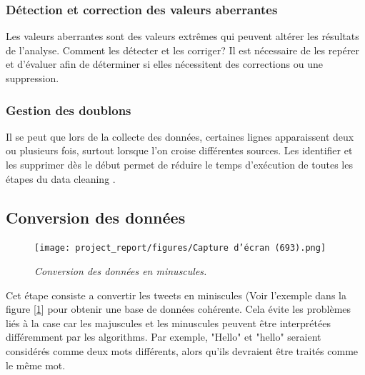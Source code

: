 \subsubsection{Détection et correction des valeurs aberrantes}
Les valeurs aberrantes sont des valeurs extrêmes qui peuvent altérer les résultats de l'analyse. Comment les détecter et les corriger? Il est nécessaire de les repérer et d'évaluer afin de déterminer si elles nécessitent des corrections ou une suppression.
\subsubsection{Gestion des doublons}
Il se peut que lors de la collecte des données, certaines lignes apparaissent deux ou plusieurs fois, surtout lorsque l’on croise différentes sources. Les identifier et les supprimer dès le début permet de réduire le temps d’exécution de toutes les étapes du data cleaning \cite{data_bird_blog}.

\subsection{Conversion des données}
\begin{figure}[h]
    \centering
    \texttt{[image: project\_report/figures/Capture d’écran (693).png]} 
    \caption{\textit{Conversion des données en minuscules. }} 
    \label{fig:figureConver}
\end{figure}
Cet étape consiste a convertir les tweets en miniscules (Voir l'exemple dans la figure [\ref{fig:figureConver}] pour obtenir une base de données cohérente. Cela évite les problèmes liés à la case car les majuscules et les minuscules peuvent être interprétées différemment par les algorithms. Par exemple, "Hello" et "hello" seraient considérés comme deux mots différents, alors qu'ils devraient être traités comme le même mot. 



